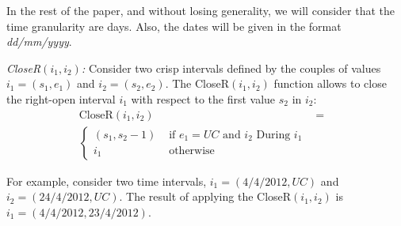 In the rest of the paper, and without losing generality, we will consider that the time granularity are days. Also, the dates will be given in the format \emph{dd/mm/yyyy}.


\begin{definition}
\emph{CloseR$\left(i_1, i_2\right)$:}
\label{def:close-a-crisp-interval-r}
Consider two crisp intervals defined by the couples of values $i_1 = \left(s_1, e_1 \right)$ and $i_2 = \left(s_2, e_2\right)$. The CloseR$\left(i_1, i_2 \right)$ function allows to close the right-open interval $i_1$ with respect to the first value $s_2$ in $i_2$:
\begin{align}
\label{eq:close-a-crisp-interval}
\mbox{CloseR} \left( i_1, i_2\right) &=& \\ 
\begin{cases}
\nonumber
\left(s_1,s_2-1\right) & \mbox{ if } e_1 = UC \mbox{ and } i_2 \mbox{ During } i_1 \\
i_1 & \mbox{ otherwise}
\end{cases}
\end{align}
\end{definition}

For example, consider two time intervals, $i_1 = \left(4/4/2012, UC \right)$ and $i_2 = \left(24/4/2012, UC \right)$. The result of applying the CloseR$\left(i_1, i_2 \right)$ is $i_1 = \left(4/4/2012, 23/4/2012 \right)$.








%



